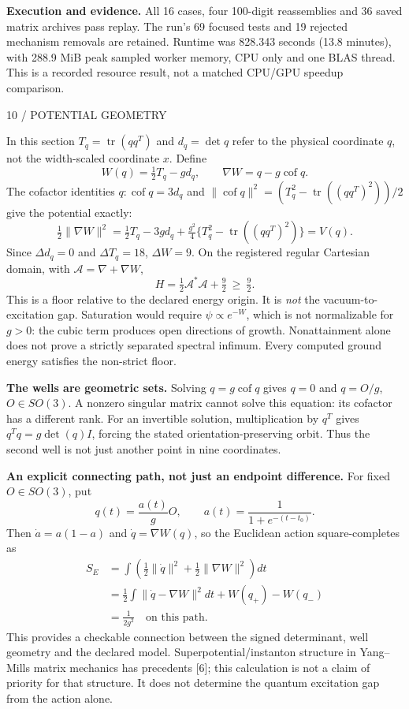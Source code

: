\documentclass[11pt,letterpaper]{article}
\theoremstyle{plain}
\theoremstyle{definition}
\newcommand{\eyebrow}[1]{{\sffamily\small\color{teal}#1}\par}
\newcommand{\pagetitle}[2]{\eyebrow{#1}\vspace{3pt}{\LARGE #2}\par\vspace{5pt}}
\begin{document}
\textbf{Execution and evidence.} All 16 cases, four 100-digit reassemblies and
36 saved matrix archives pass replay. The run's 69 focused tests and 19 rejected
mechanism removals are retained. Runtime was 828.343 seconds (13.8 minutes),
with 288.9 MiB peak sampled worker memory, CPU only and one BLAS thread.
This is a recorded resource result, not a matched CPU/GPU speedup comparison.

\newpage
\pagetitle{10 / POTENTIAL GEOMETRY}{The same operator exposes its wells and an exact floor}
In this section $T_q=\operatorname{tr}(qq^T)$ and $d_q=\det q$ refer to the
physical coordinate $q$, not the width-scaled coordinate $x$. Define
\[
 W(q)=\tfrac12T_q-gd_q,\qquad
 \nabla W=q-g\operatorname{cof}q.
\]
The cofactor identities
$q:\operatorname{cof}q=3d_q$ and
$\|\operatorname{cof}q\|^2=(T_q^2-\operatorname{tr}((qq^T)^2))/2$
give the potential exactly:
\[
 \tfrac12\|\nabla W\|^2
 =\tfrac12T_q-3gd_q+
 \tfrac{g^2}{4}\{T_q^2-\operatorname{tr}((qq^T)^2)\}=V(q).
\]
Since $\Delta d_q=0$ and $\Delta T_q=18$, $\Delta W=9$. On the registered
regular Cartesian domain, with $\mathcal A=\nabla+\nabla W$,
\[
 H=\tfrac12\mathcal A^*\mathcal A+\tfrac92\ \geq\ \tfrac92.
\]
This is a floor relative to the declared energy origin. It is \emph{not} the
vacuum-to-excitation gap. Saturation would require $\psi\propto e^{-W}$,
which is not normalizable for $g>0$: the cubic term produces open directions
of growth. Nonattainment alone does not prove a strictly separated spectral
infimum. Every computed ground energy satisfies the non-strict floor.

\textbf{The wells are geometric sets.}
Solving $q=g\operatorname{cof}q$ gives $q=0$ and $q=O/g$, $O\in SO(3)$.
A nonzero singular matrix cannot solve this equation: its cofactor has a
different rank. For an invertible solution, multiplication by $q^T$ gives
$q^Tq=g\det(q)I$, forcing the stated orientation-preserving orbit.
Thus the second well is not just another point in nine coordinates.

\textbf{An explicit connecting path, not just an endpoint difference.}
For fixed $O\in SO(3)$, put
\[
 q(t)=\frac{a(t)}gO,\qquad
 a(t)=\frac1{1+e^{-(t-t_0)}}.
\]
Then $\dot a=a(1-a)$ and $\dot q=\nabla W(q)$, so the Euclidean action
square-completes as
\begin{align*}
 S_E&=\int\left(\tfrac12\|\dot q\|^2+\tfrac12\|\nabla W\|^2\right)dt\\
 &=\tfrac12\int\|\dot q-\nabla W\|^2dt+W(q_+)-W(q_-)\\
 &=\frac1{2g^2}\quad\text{on this path}.
\end{align*}
This provides a checkable connection between the signed determinant, well
geometry and the declared model. Superpotential/instanton structure in
Yang--Mills matrix mechanics has precedents [6]; this calculation is not a
claim of priority for that structure. It does not determine the quantum
excitation gap from the action alone.
\end{document}
